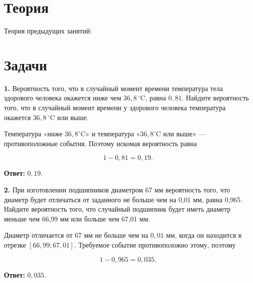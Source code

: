 
\section{Теория}

Теория предыдущих занятий:

\previoustheory

\section{Задачи}

\begin{task}\label{task-problems-1}
\textbf{1.} Вероятность того, что в случайный момент времени температура тела здорового человека окажется ниже чем $36{,}8\,^{\circ}\mathrm{C}$, равна $0{,}81$. Найдите вероятность того, что в случайный момент времени у здорового человека температура окажется $36{,}8\,^{\circ}\mathrm{C}$ или выше.
\end{task}

\begin{solution}\label{solution-problem-solving-practice-problems-1}
Температура «ниже $36{,}8^\circ\mathrm C$» и температура «$36{,}8^\circ\mathrm C$ или выше» — противоположные события. Поэтому искомая вероятность равна

\[1-0{,}81=0{,}19.\]

\textbf{Ответ:} $0{,}19$.
\end{solution}

\begin{task}\label{task-problems-2}
\textbf{2.} При изготовлении подшипников диаметром 67 мм вероятность того, что диаметр будет отличаться от заданного не больше чем на 0,01 мм, равна 0,965. Найдите вероятность того, что случайный подшипник будет иметь диаметр меньше чем 66,99 мм или больше чем 67,01 мм.
\end{task}

\begin{solution}\label{solution-problem-solving-practice-problems-2}
Диаметр отличается от $67$ мм не больше чем на $0{,}01$ мм, когда он находится в отрезке $[66{,}99;67{,}01]$. Требуемое событие противоположно этому, поэтому

\[1-0{,}965=0{,}035.\]

\textbf{Ответ:} $0{,}035$.
\end{solution}

